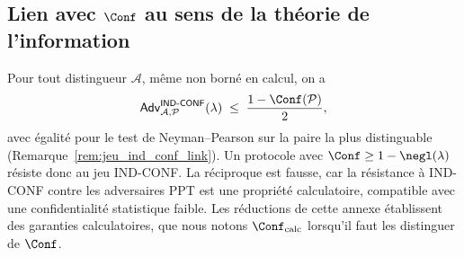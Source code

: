 \begin{sloppypar}
\subsection{Lien avec $\Conf$ au sens de la th\'eorie de l'information}

\begin{remark}
\label{rem:ann_ind_conf_link}
Pour tout distingueur $\mathcal{A}$, m\^eme non born\'e en calcul, on a
\begin{equation}
\mathsf{Adv}^{\mathsf{IND\text{-}CONF}}_{\mathcal{A},\mathcal{P}}(\lambda)
\;\leq\; \frac{1 - \Conf(\mathcal{P})}{2},
\end{equation}
avec \'egalit\'e pour le test de Neyman--Pearson sur la paire la plus
distinguable (Remarque~\ref{rem:jeu_ind_conf_link}). Un protocole avec
$\Conf \geq 1 - \negl(\lambda)$ r\'esiste donc au jeu IND-CONF. La r\'eciproque
est fausse, car la r\'esistance \`a IND-CONF contre les adversaires PPT est une
propri\'et\'e calculatoire, compatible avec une confidentialit\'e statistique faible.
Les r\'eductions de cette annexe \'etablissent des garanties calculatoires, que
nous notons $\Conf_{\mathrm{calc}}$ lorsqu'il faut les distinguer de $\Conf$.
\end{remark}

\end{sloppypar}

